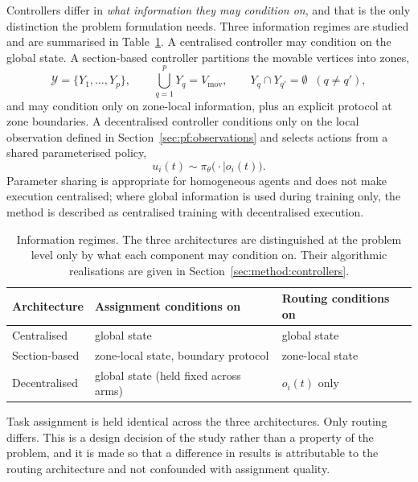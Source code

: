 \documentclass[../main.tex]{subfiles}
\begin{document}
Controllers differ in \emph{what information they may condition on}, and that is
the only distinction the problem formulation needs. Three information regimes are
studied and are summarised in Table~\ref{tab:information}. A centralised
controller may condition on the global state. A section-based controller
partitions the movable vertices into zones,
\begin{equation}
  \mathcal{Y} = \{Y_1,\dots,Y_p\}, \qquad
  \bigcup_{q=1}^{p} Y_q = V_{\mathrm{mov}}, \qquad
  Y_q \cap Y_{q'} = \emptyset \;\; (q \neq q'),
  \label{eq:partition}
\end{equation}
and may condition only on zone-local information, plus an explicit protocol at
zone boundaries. A decentralised controller conditions only on the local
observation defined in Section~\ref{sec:pf:observations} and selects actions from
a shared parameterised policy,
\[
  u_i(t) \sim \pi_\theta\bigl(\cdot \mid o_i(t)\bigr).
\]
Parameter sharing is appropriate for homogeneous agents and does not make
execution centralised; where global information is used during training only, the
method is described as centralised training with decentralised execution.

\begin{table}[t]
  \centering
  \caption{Information regimes. The three architectures are distinguished at the
  problem level only by what each component may condition on. Their algorithmic
  realisations are given in Section~\ref{sec:method:controllers}.}
  \label{tab:information}
  \begin{tabular}{lll}
    \toprule
    Architecture & Assignment conditions on & Routing conditions on \\
    \midrule
    Centralised     & global state & global state \\
    Section-based   & zone-local state, boundary protocol & zone-local state \\
    Decentralised   & global state (held fixed across arms) & $o_i(t)$ only \\
    \bottomrule
  \end{tabular}
\end{table}

Task assignment is held identical across the three architectures. Only routing
differs. This is a design decision of the study rather than a property of the
problem, and it is made so that a difference in results is attributable to the
routing architecture and not confounded with assignment quality.

\end{document}
